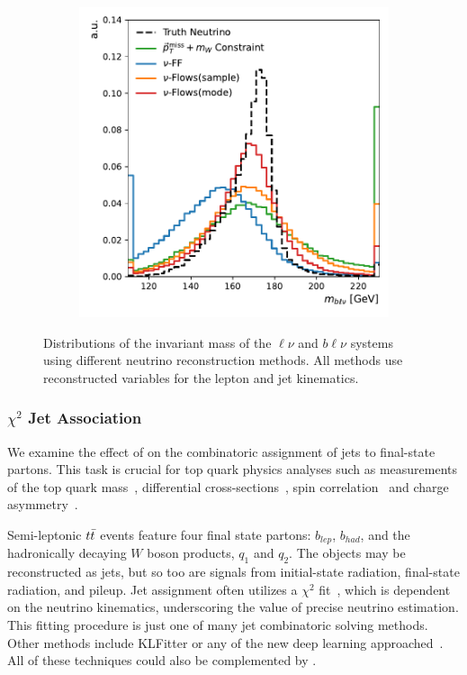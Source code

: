 \begin{figure}[htp]
\begin{subfigure}{0.48\textwidth}
        \includegraphics[width=\textwidth]{Figures/neutrino_unfolding/blnu_mass.pdf}
    \caption{} \label{fig:blv_mass}
    \end{subfigure}
    \caption{Distributions of the invariant mass of the $\ell\nu$  and $b\ell\nu$  systems using different neutrino reconstruction methods. All methods use reconstructed variables for the lepton and jet kinematics.}
    \label{fig:real_assoc_masses}
\end{figure}

\subsubsection{\texorpdfstring{$\chi^2$}{Chi Squared} Jet Association}

We examine the effect of \nuflow on the combinatoric assignment of jets to final-state partons.
This task is crucial for top quark physics analyses such as measurements of the top quark mass~\cite{ATLAS:2015pfy,CMS:2018quc,ATLAS:2018fwq,ATLAS:2019guf}, differential cross-sections~\cite{CMS:2016oae,CMS:2018htd,ATLAS:2019hxz,CMS:2021vhb}, spin correlation~\cite{CMS:2015cal} and charge asymmetry~\cite{ATLAS:2022waa}.

Semi-leptonic $t\bar{t}$ events feature four final state partons: $b_{lep}$, $b_{had}$, and the hadronically decaying $W$ boson products, $q_1$ and $q_2$.
The objects may be reconstructed as jets, but so too are signals from initial-state radiation, final-state radiation, and pileup.
Jet assignment often utilizes a $\chi^2$ fit~\cite{Chi2ATLAS}, which is dependent on the neutrino kinematics, underscoring the value of precise neutrino estimation.
This fitting procedure is just one of many jet combinatoric solving methods.
Other methods include KLFitter \cite{KLFitter} or any of the new deep learning approached~\cite{SAJA, SPANet, Spatter, TopoGraphs}.
All of these techniques could also be complemented by \nuflow{}.

